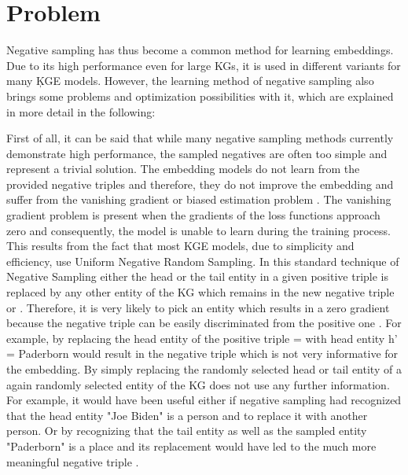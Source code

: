 \section{Problem}

Negative sampling has thus become a common method for learning embeddings.
Due to its high performance even for large \acp{KG}, it is used in different variants for many \c{KGE} models.
However, the learning method of negative sampling also brings some problems and optimization possibilities with it, which are explained in more detail in the following:

First of all, it can be said that while many negative sampling methods currently demonstrate high performance, the sampled negatives are often too simple and represent a trivial solution. 
The embedding models do not learn from the provided negative triples and therefore, they do not improve the embedding and suffer from the vanishing gradient or biased estimation problem \cite{zhang2021efficient}.
The vanishing gradient problem is present when the gradients of the loss functions approach zero and consequently, the model is unable to learn during the training process.
This results from the fact that most KGE models, due to simplicity and efficiency, use Uniform Negative Random Sampling.
In this standard technique of Negative Sampling either the head or the tail entity in a given positive triple  is replaced by any other entity of the \ac{KG} which remains in the new negative triple  or . 
Therefore, it is very likely to pick an entity which results in a zero gradient because
the negative triple can be easily discriminated from the positive one \cite{cai2017kbgan}.
For example, by replacing the head entity of the positive triple  =  with head entity h' = Paderborn would result in the negative triple  which is not very informative for the embedding.
By simply replacing the randomly selected head or tail entity of a again randomly selected entity of the KG does not use any further information.
For example, it would have been useful either if negative sampling had recognized that the head entity "Joe Biden" is a person and to replace it with another person.
Or by recognizing that the tail entity as well as the sampled entity "Paderborn" is a place and its replacement would have led to the  much more meaningful negative triple .  

